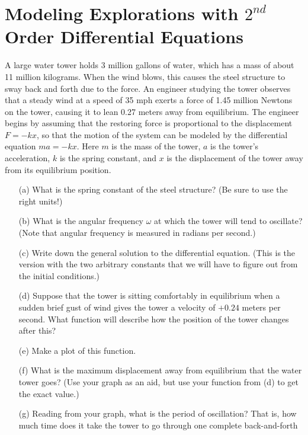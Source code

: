 \newpage\section{Modeling Explorations with $2^{nd}$ Order Differential Equations}
\begin{problem}
    A large water tower holds 3 million gallons of water, which has a mass of about 11
    million kilograms.  When the wind blows, this causes the steel structure to sway back
    and forth due to the force.  An engineer studying the tower observes that a steady
    wind at a speed of 35 mph exerts a force of 1.45 million Newtons on the tower, causing
    it to lean 0.27 meters away from equilibrium.  The engineer begins by assuming that
    the restoring force is proportional to the displacement $F = - k x$, so that the motion
    of the system can be modeled by the differential equation $m a = -k x$.  Here $m$ is the
    mass of the tower, $a$ is the tower's acceleration, $k$ is the spring constant, and $x$ is
    the displacement of the tower away from its equilibrium position.
    \begin{enumerate}
        \item[(a)] What is the spring constant of the steel structure?  (Be sure to
            use the right units!)
        \item[(b)] What is the angular frequency $\omega$ at which the tower will tend to oscillate?
            (Note that angular frequency is measured in radians per second.)
        \item[(c)] Write down the general solution to the differential equation.  (This is
            the version with the two arbitrary constants that we will have to figure out
            from the initial conditions.)
        \item[(d)] Suppose that the tower is sitting comfortably in equilibrium when a sudden
            brief gust of wind gives the tower a velocity of $+0.24$ meters per second.
            What function will describe how the position of the tower changes after this?
        \item[(e)] Make a plot of this function.
        \item[(f)] What is the maximum displacement away from equilibrium that the water
            tower goes? (Use your graph as an aid, but use your function from (d) to get
            the exact value.)
        \item[(g)] Reading from your graph, what is the period of oscillation?  That is, how
            much time does it take the tower to go through one complete back-and-forth

\end{enumerate}
\end{problem}

